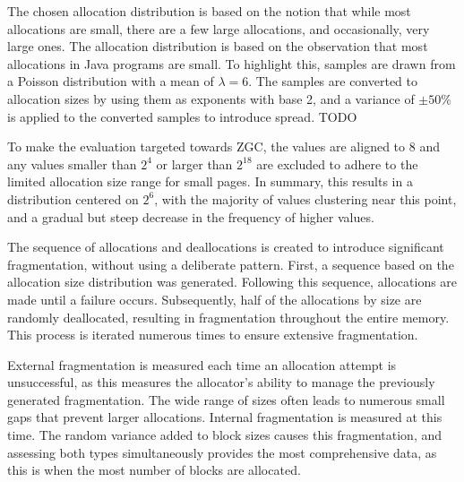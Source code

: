 The chosen allocation distribution is based on the notion that while most allocations are small, there are a few large allocations, and occasionally, very large ones.
The allocation distribution is based on the observation that most allocations in Java programs are small. To highlight this, samples are drawn from a Poisson distribution with a mean of $\lambda = 6$. The samples are converted to allocation sizes by using them as exponents with base 2, and a variance of $\pm 50\%$ is applied to the converted samples to introduce spread. TODO

To make the evaluation targeted towards ZGC, the values are aligned to $8$ and any values smaller than $2^4$ or larger than $2^{18}$ are excluded to adhere to the limited allocation size range for small pages. In summary, this results in a distribution centered on $2^6$, with the majority of values clustering near this point, and a gradual but steep decrease in the frequency of higher values.

The sequence of allocations and deallocations is created to introduce significant fragmentation, without using a deliberate pattern. First, a sequence based on the allocation size distribution was generated. Following this sequence, allocations are made until a failure occurs. Subsequently, half of the allocations by size are randomly deallocated, resulting in fragmentation throughout the entire memory. This process is iterated numerous times to ensure extensive fragmentation.

External fragmentation is measured each time an allocation attempt is unsuccessful, as this measures the allocator's ability to manage the previously generated fragmentation. The wide range of sizes often leads to numerous small gaps that prevent larger allocations. Internal fragmentation is measured at this time. The random variance added to block sizes causes this fragmentation, and assessing both types simultaneously provides the most comprehensive data, as this is when the most number of blocks are allocated.


